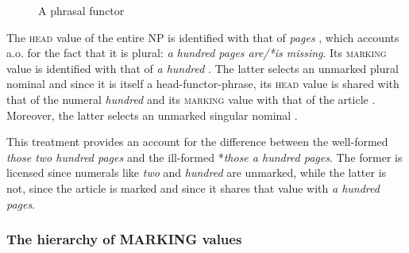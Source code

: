 \documentclass[output=paper
                ,modfonts
                ,nonflat
	        ,collection
	        ,collectionchapter
	        ,collectiontoclongg
 	        ,biblatex
                ,babelshorthands
                ,newtxmath
                ,draftmode
                ,colorlinks, citecolor=brown
]{./langsci/langscibook}
\begin{document}
\begin{figure}
\centering
{}
\caption{\label{glorie} A phrasal functor}
\end{figure}

The \textsc{head} value of the entire NP is identified with that 
of \emph{pages} , which accounts a.o. for the fact that it is plural:
\emph{a hundred pages are/*is missing}. 
Its \textsc{marking} value is identified with that of \emph{a hundred} 
. The latter selects an unmarked plural nominal  and 
since it is itself a head-functor-phrase, its \textsc{head} value is shared with 
that of the numeral \emph{hundred}  and its \textsc{marking} value 
with that of the article . Moreover, the latter selects an unmarked 
singular nominal .
 
This treatment provides an account for the difference between 
the well-formed \emph{those two hundred pages} and the 
ill-formed *\emph{those a hundred pages}. The former is licensed since numerals 
like \emph{two} and \emph{hundred} are unmarked, while the latter is not, since 
the article is marked and since it shares that value with \emph{a hundred pages}.  


\subsubsection{The hierarchy of MARKING values} 
\label{sec-without-spec}
\end{document}
